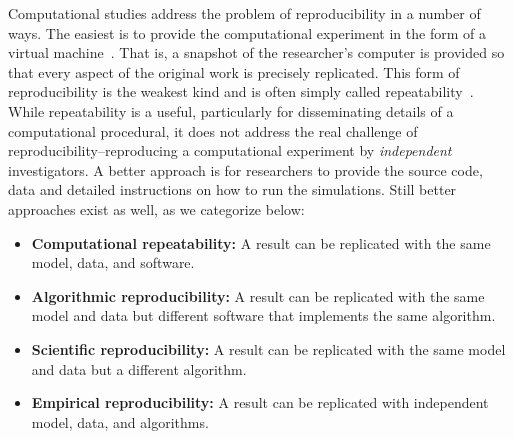\documentclass[10pt,letterpaper]{article}
\begin{document}
Computational studies address the problem of reproducibility in a number of ways. The easiest is to provide the computational experiment in the form of a virtual machine~\cite{piccolo2016tools}. That is, a snapshot of the researcher's computer is provided so that every aspect of the original work is precisely replicated. This form of reproducibility is the weakest kind and is often simply called repeatability~\cite{drummond2009replicability}. While repeatability is a useful, particularly for disseminating details of a computational procedural, it does not address the real challenge of reproducibility--reproducing a computational experiment by {\em independent} investigators. A better approach is for researchers to provide the source code, data and detailed instructions on how to run the simulations. Still better approaches exist as well, as we categorize below:

\begin{itemize}
\item \textbf{Computational repeatability:} A result can be replicated with the same model, data, and software.
\item \textbf{Algorithmic reproducibility:} A result can be replicated with the same model and data but different software that implements the same algorithm.
\item \textbf{Scientific reproducibility:} A result can be replicated with the same model and data but a different algorithm.
\item \textbf{Empirical reproducibility:} A result can be replicated with independent model, data, and algorithms.
\end{itemize}
\end{document}
